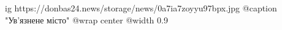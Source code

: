  
 
 
 
 

\ifcmt
  ig https://donbas24.news/storage/news/0a7ia7zoyyu97bpx.jpg
	@caption "Ув'язнене місто"
  @wrap center
  @width 0.9
\fi
